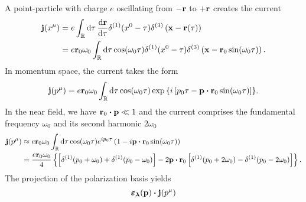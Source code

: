 \begin{example}
	A point-particle with charge $e$ oscillating from $-\vb{r}$ to $+\vb{r}$ creates the current
	\begin{equation*}
		\begin{split}
			\vb{j}(x^\mu)
			&=
			e
			\int_\mathbb{R}\dd{\tau}
			\dv{\vb{r}}{\tau}
			\delta^{(1)}(x^0-\tau)
			\delta^{(3)}\left(\vb{x}-\vb{r}(\tau)\right)
			\\
			&=
			e\vb{r}_0\omega_0
			\int_\mathbb{R}\dd{\tau}
			\cos(\omega_0\tau)
			\delta^{(1)}(x^0-\tau)
			\delta^{(3)}\left(\vb{x}-\vb{r}_0\sin(\omega_0\tau)\right)
			.
		\end{split}
	\end{equation*}
	In momentum space, the current takes the form
	\begin{equation*}
		\begin{split}
			\vb{j}(p^\mu)
			=
			e\vb{r}_0\omega_0
			\int_\mathbb{R}\dd{\tau}
			\cos(\omega_0\tau)
			\exp\left\{
				i\left[
					p_0\tau
					-
					\vb{p}\vdot\vb{r}_0
					\sin(\omega_0\tau)
				\right]
			\right\}
		\end{split}
		.
	\end{equation*}
	In the near field, we have $\vb{r}_0\vdot\vb{p}\ll1$ and the current comprises the fundamental frequency $\omega_0$ and its second harmonic $2\omega_0$
	\begin{equation*}
		\begin{split}
			\vb{j}(p^\mu)
			&\approx
			e\vb{r}_0\omega_0
			\int_\mathbb{R}\dd{\tau}
			\cos(\omega_0\tau)
			e^{ip_0\tau}
			\left(
				1
				-
				i
				\vb{p}
				\vdot
				\vb{r}_0
				\sin(\omega_0\tau)
			\right)
			\\
			&=
			\frac{e\vb{r}_0\omega_0}{4}
			\left\{
				\left[
					\delta^{(1)}(p_0+\omega_0)
					+
					\delta^{(1)}(p_0-\omega_0)
				\right]
				-
				2
				\vb{p}
				\vdot
				\vb{r}_0
				\left[
					\delta^{(1)}(p_0+2\omega_0)
					-
					\delta^{(1)}(p_0-2\omega_0)
				\right]				
			\right\}
			.
		\end{split}
	\end{equation*}
	The projection of the polarization basis yields
	\begin{equation*}
		\boldsymbol{\varepsilon_\lambda}(\vb{p})
		\vdot
		\vb{j}(p^\mu)
	\end{equation*}
\end{example}
